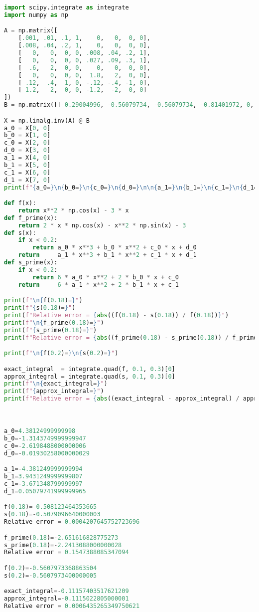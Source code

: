 \documentclass{article}
\begin{document}
\begin{lstlisting}[language=Python]
import scipy.integrate as integrate
import numpy as np

A = np.matrix([
    [.001, .01, .1, 1,    0,   0,  0, 0],
    [.008, .04, .2, 1,    0,   0,  0, 0],
    [   0,   0,  0, 0, .008, .04, .2, 1],
    [   0,   0,  0, 0, .027, .09, .3, 1],
    [  .6,   2,  0, 0,    0,   0,  0, 0],
    [   0,   0,  0, 0,  1.8,   2,  0, 0],
    [ .12,  .4,  1, 0, -.12, -.4, -1, 0],
    [ 1.2,   2,  0, 0, -1.2,  -2,  0, 0]
])
B = np.matrix([[-0.29004996, -0.56079734, -0.56079734, -0.81401972, 0, 0, 0, 0]]).T

X = np.linalg.inv(A) @ B
a_0 = X[0, 0]
b_0 = X[1, 0]
c_0 = X[2, 0]
d_0 = X[3, 0]
a_1 = X[4, 0]
b_1 = X[5, 0]
c_1 = X[6, 0]
d_1 = X[7, 0]
print(f"{a_0=}\n{b_0=}\n{c_0=}\n{d_0=}\n\n{a_1=}\n{b_1=}\n{c_1=}\n{d_1=}")

def f(x):
    return x**2 * np.cos(x) - 3 * x
def f_prime(x):
    return 2 * x * np.cos(x) - x**2 * np.sin(x) - 3
def s(x):
    if x < 0.2:
        return a_0 * x**3 + b_0 * x**2 + c_0 * x + d_0
    return     a_1 * x**3 + b_1 * x**2 + c_1 * x + d_1
def s_prime(x):
    if x < 0.2:
        return 6 * a_0 * x**2 + 2 * b_0 * x + c_0
    return     6 * a_1 * x**2 + 2 * b_1 * x + c_1

print(f"\n{f(0.18)=}")
print(f"{s(0.18)=}")
print(f"Relative error = {abs((f(0.18) - s(0.18)) / f(0.18))}")
print(f"\n{f_prime(0.18)=}")
print(f"{s_prime(0.18)=}")
print(f"Relative error = {abs((f_prime(0.18) - s_prime(0.18)) / f_prime(0.18))}")

print(f"\n{f(0.2)=}\n{s(0.2)=}")

exact_integral  = integrate.quad(f, 0.1, 0.3)[0]
approx_integral = integrate.quad(s, 0.1, 0.3)[0]
print(f"\n{exact_integral=}")
print(f"{approx_integral=}")
print(f"Relative error = {abs((exact_integral - approx_integral) / approx_integral)}")



a_0=4.38124999999998
b_0=-1.3143749999999947
c_0=-2.6198488000000006
d_0=-0.01930258000000029

a_1=-4.381249999999994
b_1=3.9431249999999807
c_1=-3.671348799999997
d_1=0.05079741999999965

f(0.18)=-0.508123464353665
s(0.18)=-0.5079096640000003
Relative error = 0.0004207645752723696

f_prime(0.18)=-2.651616828775273
s_prime(0.18)=-2.2413088000000028
Relative error = 0.1547388085347094

f(0.2)=-0.5607973368863504
s(0.2)=-0.5607973400000005

exact_integral=-0.11157403517621209
approx_integral=-0.1115022805000001
Relative error = 0.0006435265349750621
\end{lstlisting}
\end{document}
